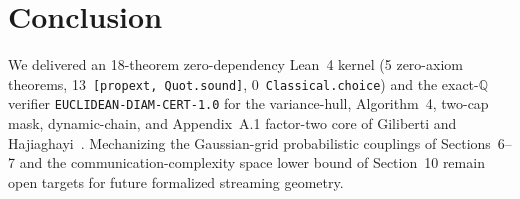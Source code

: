 \documentclass[11pt,twocolumn]{article}
\newcommand{\QQ}{\mathbb{Q}}
\begin{document}
\section{Conclusion}
We delivered an 18-theorem zero-dependency Lean~4 kernel (5 zero-axiom theorems, 13~\texttt{[propext, Quot.sound]}, 0~\texttt{Classical.choice}) and the exact-$\QQ$ verifier \texttt{EUCLIDEAN-DIAM-CERT-1.0} for the variance-hull, Algorithm~4, two-cap mask, dynamic-chain, and Appendix~A.1 factor-two core of Giliberti and Hajiaghayi~\cite{giliberti2026diameter}. Mechanizing the Gaussian-grid probabilistic couplings of Sections~6--7 and the communication-complexity space lower bound of Section~10 remain open targets for future formalized streaming geometry.



\end{document}
